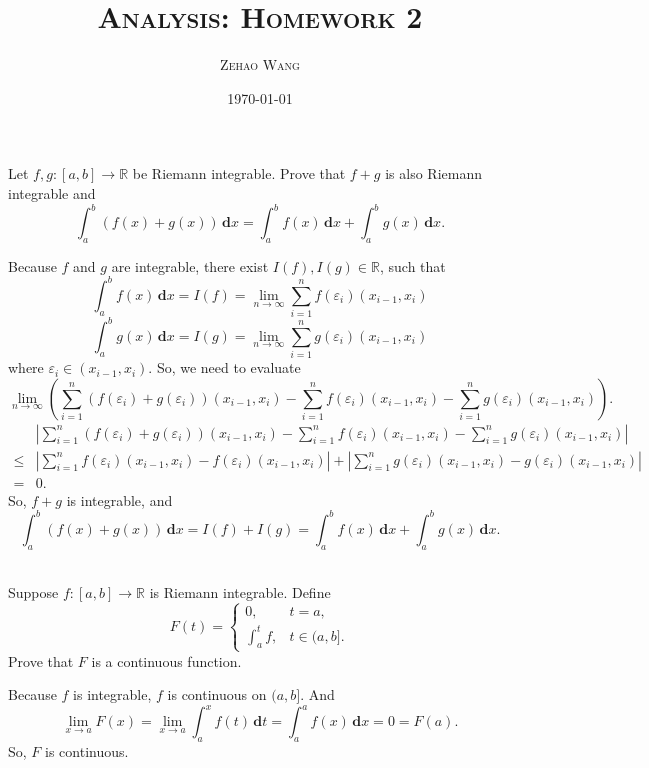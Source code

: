 \documentclass[en, normal, 11pt, black]{elegantnote}
\title{\textsc{Analysis: Homework 2}}
\author{\textsc{Zehao Wang}}
\date{\today}
\newenvironment{exercise}[1]{\begin{tcolorbox}[colback=black!15, colframe=black!80, breakable, title=#1]}{\end{tcolorbox}}
\renewenvironment{proof}{\begin{tcolorbox}[colback=white, colframe=black!50, breakable, title=Proof. ]\setlength{\parskip}{0.8em}}{\,\\\rightline{$\square$}\end{tcolorbox}}
\newcommand{\der}{\,\mathbf{d}}
\begin{document}
\maketitle

\begin{exercise}{(1), }
    Let $f, g:[a, b] \rightarrow \mathbb{R}$ be Riemann integrable. Prove that $f+g$ is also Riemann integrable and
    \[
        \int_{a}^{b}(f(x)+g(x))\der x=\int_{a}^{b} f(x)\der x+\int_{a}^{b} g(x)\der x. 
    \]
\end{exercise}
\begin{proof}
    Because $f$ and $g$ are integrable, there exist $I(f), I(g)\in\mathbb{R}$, such that
    \[
        \int_{a}^{b} f(x)\der x=I(f)=\lim_{n\to\infty}\sum_{i=1}^{n}f(\varepsilon_i)(x_{i-1}, x_i)
    \]
    \[
        \int_{a}^{b} g(x)\der x=I(g)=\lim_{n\to\infty}\sum_{i=1}^{n}g(\varepsilon_i)(x_{i-1}, x_i)
    \]
    where $\varepsilon_i\in(x_{i-1}, x_i)$. So, we need to evaluate 
    \[
        \lim_{n\to\infty}\left(\sum_{i=1}^{n}\left(f(\varepsilon_i)+g(\varepsilon_i)\right)(x_{i-1}, x_i)-\sum_{i=1}^{n}f(\varepsilon_i)(x_{i-1}, x_i)-\sum_{i=1}^{n}g(\varepsilon_i)(x_{i-1}, x_i)\right). 
    \]
    \begin{align*}
        &\left|\sum_{i=1}^{n}\left(f(\varepsilon_i)+g(\varepsilon_i)\right)(x_{i-1}, x_i)-\sum_{i=1}^{n}f(\varepsilon_i)(x_{i-1}, x_i)-\sum_{i=1}^{n}g(\varepsilon_i)(x_{i-1}, x_i)\right|\\
        \leqslant&\left|\sum_{i=1}^{n}f(\varepsilon_i)(x_{i-1}, x_i)-f(\varepsilon_i)(x_{i-1}, x_i)\right|+\left|\sum_{i=1}^{n}g(\varepsilon_i)(x_{i-1}, x_i)-g(\varepsilon_i)(x_{i-1}, x_i)\right|\\
        =&0. 
    \end{align*}
    So, $f+g$ is integrable, and
    \[
        \int_{a}^{b}(f(x)+g(x))\der x=I(f)+I(g)=\int_{a}^{b} f(x)\der x+\int_{a}^{b} g(x)\der x. 
    \]
    \vspace{-30pt}
\end{proof}

\begin{exercise}{(2), }
    Suppose $f:[a, b] \rightarrow \mathbb{R}$ is Riemann integrable. Define 
    \[
        F(t)= \begin{cases}0, & t=a, \\ \int_{a}^{t} f, & t \in(a, b]. \end{cases}
    \]
    Prove that $F$ is a continuous function. 
\end{exercise}
\begin{proof}
    Because $f$ is integrable, $f$ is continuous on $(a,b]$. And
    \[\lim_{x\to a}F(x)=\lim_{x\to a}\int_{a}^{x}f(t)\der t=\int_a^af(x)\der x=0=F(a). \]
    So, $F$ is continuous. 
\end{proof}
\end{document}
